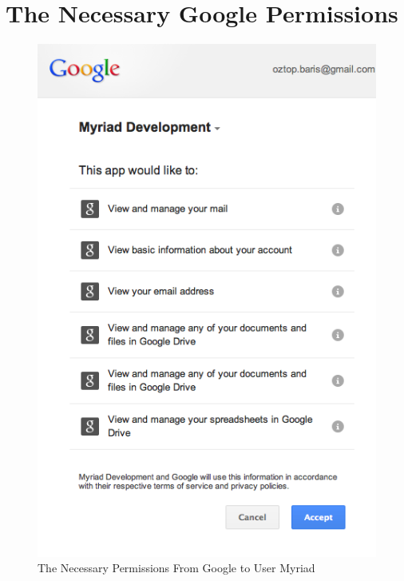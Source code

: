 \clearemptydoublepage
{}
\chapter{The Necessary Google Permissions}
\label{app:GoogPerm}


\begin{figure}[htbp]
	\centering
	\includegraphics[scale=0.55]{imgs/GooglePermissions.png}
	\caption[The Necessary Permissions From Google to User Myriad]{The Necessary Permissions From Google to User Myriad}
	\label{fig:GooglePermissions}
\end{figure}


